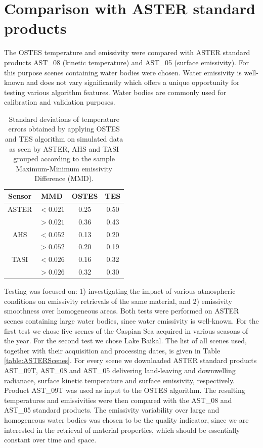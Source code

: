 \section{Comparison with ASTER standard products}

The OSTES temperature and emissivity were compared with ASTER standard products AST\_08 (kinetic temperature) and AST\_05 (surface emissivity). For this purpose scenes containing water bodies were chosen. Water emissivity is well-known and does not vary significantly which offers a unique opportunity for testing various algorithm features. Water bodies are commonly used for calibration \cite{TP05-2,T05} and validation \cite{TP05, TP01} purposes.

\begin{table}[!t]
\vspace{0.5em}
\footnotesize
\centering
\begin{tabular}{cccc}
\toprule
Sensor & MMD & OSTES & TES \\ \hline
ASTER 	& $< 0.021$ & 0.25 & 0.50 \\
 		& $> 0.021$ & 0.36 & 0.43 \\ \hline
AHS 		& $< 0.052$ & 0.13 & 0.20 \\
 		& $> 0.052$ & 0.20 & 0.19 \\ \hline
TASI 	& $< 0.026$ & 0.16 & 0.32 \\
 		& $> 0.026$ & 0.32 & 0.30 \\
\bottomrule
\end{tabular}
\vspace{1.5 em}
\caption{Standard deviations of temperature errors obtained by applying OSTES and TES algorithm on simulated data as seen by ASTER, AHS and TASI grouped according to the sample Maximum-Minimum emissivity Difference (MMD). }
\label{table:StandardDeviations}
\normalsize
\end{table}

Testing was focused on: 1) investigating the impact of  various atmospheric conditions on emissivity retrievals of the same material, and 2) emissivity smoothness over homogeneous areas. Both tests were performed on ASTER scenes containing large water bodies, since water emissivity is well-known. For the first test we chose five scenes of the Caspian Sea acquired in various seasons of the year. For the second test we chose Lake Baikal. The list of all scenes used, together with their acquisition and processing dates, is given in Table \ref{table:ASTERScenes}. For every scene we downloaded ASTER standard products AST\_09T, AST\_08 and AST\_05 delivering land-leaving and downwelling radianace, surface kinetic temperature and surface emissivity, respectively. Product AST\_09T was used as input to the OSTES algorithm. The resulting temperatures and emissivities were then compared with the AST\_08 and AST\_05 standard products. The emissivity variability over large and homogeneous water bodies was chosen to be the quality indicator, since we are interested in the retrieval of material properties, which should be essentially constant over time and space.


